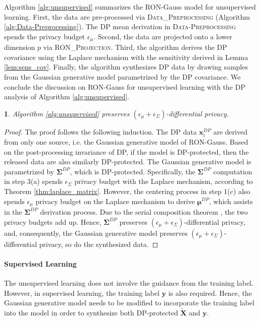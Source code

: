\documentclass[USenglish,oneside,twocolumn]{article}
\newcommand{\noun}[1]{\textsc{#1}}
\theoremstyle{definition}
\theoremstyle{remark}
\theoremstyle{plain}
\newtheorem{thm}{\protect\theoremname}
\theoremstyle{plain}
\providecommand{\theoremname}{Theorem}
\begin{document}
Algorithm \ref{alg:unsupervised} summarizes the RON-Gauss model for
unsupervised learning. First, the data are pre-processed via \noun{Data\_Preprocessing}
(Algorithm \ref{alg:Data-Preprocessing}). The DP mean derivation
in \noun{Data-Preprocessing} spends the privacy budget $\epsilon_{\mu}$.
Second, the data are projected onto a lower dimension $p$ via \noun{RON\_Projection}.
Third, the algorithm derives the DP covariance using the Laplace mechanism
with the sensitivity derived in Lemma \ref{lem:sens_cov}. Finally,
the algorithm synthesizes DP data by drawing samples from the Gaussian
generative model parametrized by the DP covariance. 
We conclude the discussion on RON-Gauss for unsupervised learning with the DP analysis of Algorithm \ref{alg:unsupervised}.
\begin{thm}
\label{thm:unsupervised_priv}Algorithm \ref{alg:unsupervised} preserves
$(\epsilon_{\mu}+\epsilon_{\Sigma})$-differential privacy. 
\end{thm}
\begin{proof}
The proof follows the following induction. The DP data $\mathbf{x}_{i}^{DP}$
are derived from only one source, i.e. the Gaussian generative model
of RON-Gauss. Based on the post-processing invariance of DP, if the
model is DP-protected, then the released data are also similarly DP-protected.
The Gaussian generative model is parametrized by $\boldsymbol{\Sigma}^{DP}$,
which is DP-protected. Specifically, the $\boldsymbol{\Sigma}^{DP}$
computation in step 3(a) spends $\epsilon_{\Sigma}$ privacy budget
with the Laplace mechanism, according to Theorem \ref{thm:laplace_matrix}.
However, the centering process in step 1(c) also spends $\epsilon_{\mu}$
privacy budget on the Laplace mechanism to derive $\boldsymbol{\mu}^{DP}$,
which assists in the $\boldsymbol{\Sigma}^{DP}$ derivation process.
Due to the serial composition theorem \cite{RefWorks:185}, the two
privacy budgets add up. Hence, $\boldsymbol{\Sigma}^{DP}$ preserves
$(\epsilon_{\mu}+\epsilon_{\Sigma})$-differential privacy, and, consequently,
the Gaussian generative model preserves $(\epsilon_{\mu}+\epsilon_{\Sigma})$-differential
privacy, so do the synthesized data.
\end{proof}

\vspace{-0.5em}
\paragraph{Supervised Learning}

The unsupervised learning does not involve the guidance from the training label. However, in supervised learning, the training label $\mathbf{y}$ is also required. Hence, the
Gaussian generative model needs to be modified to incorporate the
training label into the model in order to synthesize both DP-protected
$\widetilde{\mathbf{X}}$ and $\mathbf{y}$. 
\end{document}
